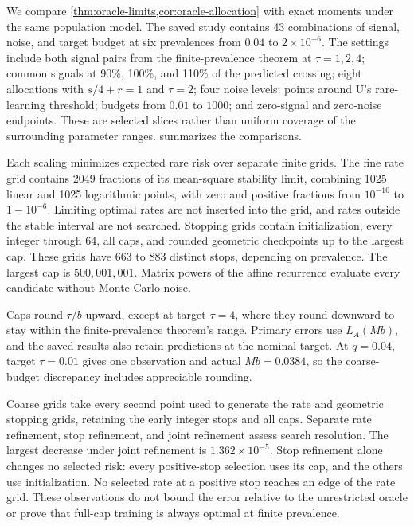 \documentclass{alt2027}
\begin{document}
We compare \cref{thm:oracle-limits,cor:oracle-allocation} with exact moments
under the same population model. The saved study contains 43 combinations of
signal, noise, and target budget at six prevalences from $0.04$ to
$2 \times 10^{-6}$. The settings include both signal pairs from the
finite-prevalence theorem at $\tau = 1,2,4$; common signals at 90\%, 100\%, and
110\% of the predicted crossing; eight allocations with $s/4 + r = 1$ and
$\tau = 2$; four noise levels; points around U's rare-learning threshold;
budgets from $0.01$ to $1000$; and zero-signal and zero-noise endpoints. These
are selected slices rather than uniform coverage of the surrounding parameter
ranges.  summarizes the comparisons.

Each scaling minimizes expected rare risk over separate finite grids. The fine
rate grid contains 2049 fractions of its mean-square stability limit, combining
1025 linear and 1025 logarithmic points, with zero and positive fractions from
$10^{-10}$ to $1 - 10^{-6}$. Limiting optimal rates are not inserted into the
grid, and rates outside the stable interval are not searched. Stopping grids
contain initialization, every integer through 64, all caps, and rounded
geometric checkpoints up to the largest cap. These grids have 663 to 883
distinct stops, depending on prevalence. The largest cap is $500{,}001{,}001$.
Matrix powers of the affine recurrence evaluate every candidate without Monte
Carlo noise.

Caps round $\tau/b$ upward, except at target $\tau = 4$, where they round
downward to stay within the finite-prevalence theorem's range. Primary errors
use $L_A(Mb)$, and the saved results also retain predictions at the nominal
target. At $q = 0.04$, target $\tau = 0.01$ gives one observation and actual
$Mb = 0.0384$, so the coarse-budget discrepancy includes appreciable rounding.

Coarse grids take every second point used to generate the rate and geometric
stopping grids, retaining the early integer stops and all caps. Separate rate
refinement, stop refinement, and joint refinement assess search resolution. The
largest decrease under joint refinement is $1.362 \times 10^{-5}$. Stop
refinement alone changes no selected risk: every positive-stop selection uses
its cap, and the others use initialization. No selected rate at a positive stop
reaches an edge of the rate grid. These observations do not bound the error
relative to the unrestricted oracle or prove that full-cap training is always
optimal at finite prevalence.
\end{document}
